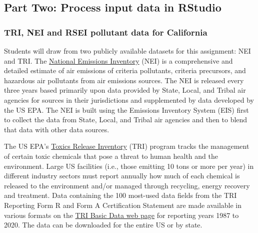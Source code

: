 \documentclass[
  letterpaper,
  DIV=11,
  numbers=noendperiod]{scrartcl}
\begin{document}
\hypertarget{part-two-process-input-data-in-rstudio}{%
\subsection{Part Two: Process input data in
RStudio}\label{part-two-process-input-data-in-rstudio}}

\hypertarget{tri-nei-and-rsei-pollutant-data-for-california}{%
\subsubsection{TRI, NEI and RSEI pollutant data for
California}\label{tri-nei-and-rsei-pollutant-data-for-california}}

Students will draw from two publicly available datasets for this
assignment: NEI and TRI. The
\href{https://www.epa.gov/air-emissions-inventories/national-emissions-inventory-nei}{National
Emissions Inventory} (NEI) is a comprehensive and detailed estimate of
air emissions of criteria pollutants, criteria precursors, and hazardous
air pollutants from air emissions sources. The NEI is released every
three years based primarily upon data provided by State, Local, and
Tribal air agencies for sources in their jurisdictions and supplemented
by data developed by the US EPA. The NEI is built using the Emissions
Inventory System (EIS) first to collect the data from State, Local, and
Tribal air agencies and then to blend that data with other data sources.

The US EPA's
\href{https://www.epa.gov/toxics-release-inventory-tri-program/what-toxics-release-inventory}{Toxics
Release Inventory} (TRI) program tracks the management of certain toxic
chemicals that pose a threat to human health and the environment. Large
US facilities (i.e., those emitting 10 tons or more per year) in
different industry sectors must report annually how much of each
chemical is released to the environment and/or managed through
recycling, energy recovery and treatment. Data containing the 100
most-used data fields from the TRI Reporting Form R and Form A
Certification Statement are made available in various formats on the
\href{https://www.epa.gov/toxics-release-inventory-tri-program/tri-basic-data-files-calendar-years-1987-present}{TRI
Basic Data web page} for reporting years 1987 to 2020. The data can be
downloaded for the entire US or by state.
\end{document}
